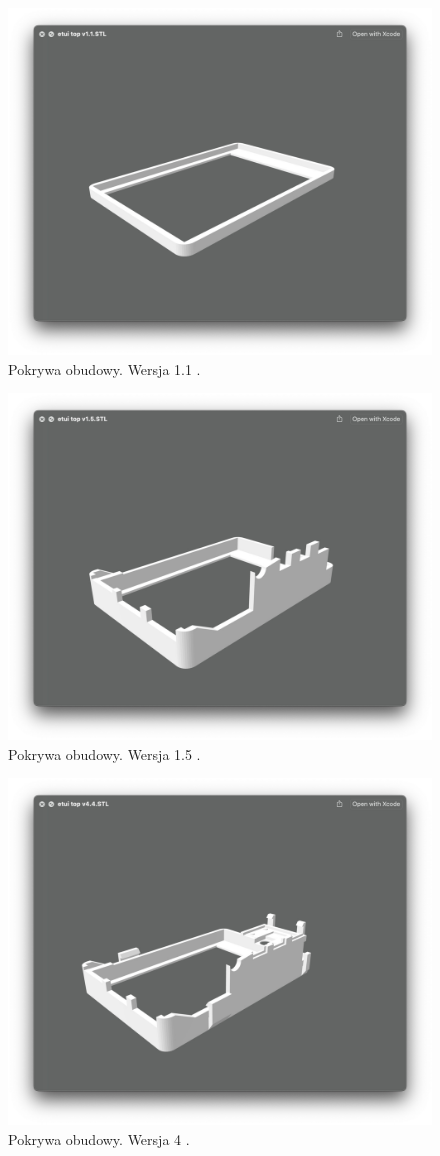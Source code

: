 \documentclass[a4paper,12pt,reqno]{article}
\begin{document}
\begin{figure}[H]%
\centering
\includegraphics[width=0.8\columnwidth]{imgs/etui_top_v1.1.jpg}
\caption{Pokrywa obudowy. Wersja 1.1 \cite{img_me}. \label{etui_top_v1.1}}
\quad
\end{figure}

\begin{figure}[H]%
\centering
\includegraphics[width=0.8\columnwidth]{imgs/etui_top_v1.5.jpg}
\caption{Pokrywa obudowy. Wersja 1.5 \cite{img_me}. \label{etui_top_v1.5}}
\quad
\end{figure}

\begin{figure}[H]%
\centering
\includegraphics[width=0.8\columnwidth]{imgs/etui_top_v4.4.jpg}
\caption{Pokrywa obudowy. Wersja 4 \cite{img_me}. \label{etui_top_v4.4}}
\quad
\end{figure}
\end{document}

